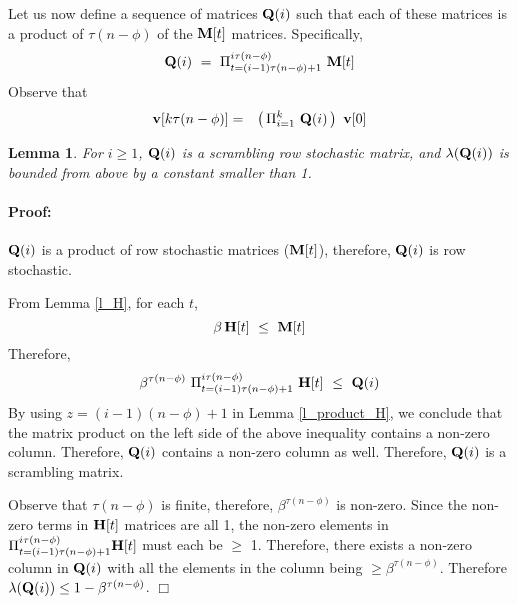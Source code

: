 \documentclass[letterpaper, 12pt]{article}
\newenvironment{proof}{\paragraph{\bf Proof:}}{\hspace*{\fill}\(\Box\)}
\newtheorem{lemma}{Lemma}
\begin{document}
Let us now define a sequence of matrices ${\bf Q}(i)$ such that
each of these matrices is a product of $\tau(n-\phi)$ of the
${\bf M}[t]$ matrices. Specifically,
\[
{\bf Q}(i) ~=~ \Pi_{t=(i-1)\tau(n-\phi)+1}^{i\tau(n-\phi)} ~ {\bf M}[t]
\]
Observe that
\begin{eqnarray}
{\bf v}[k\tau(n-\phi)] & = & \left(\, \Pi_{i=1}^k ~ {\bf Q}(i) \,\right)~{\bf v}[0]
\end{eqnarray}


\begin{lemma}
\label{l_Q}
For $i\geq 1$, ${\bf Q}(i)$ is a scrambling row stochastic matrix,
and $\lambda({\bf Q}(i))$ is bounded from above by a constant
smaller than 1.
\end{lemma}
\begin{proof}


${\bf Q}(i)$ is a product of row stochastic matrices (${\bf M}[t]$), therefore,
${\bf Q}(i)$ is row stochastic.

From Lemma \ref{l_H}, for each $t$,
\[
\beta \, {\bf H}[t] ~ \leq ~ {\bf M}[t]
\]
Therefore, 
\[
\beta^{\tau(n-\phi)} ~ \Pi_{t=(i-1)\tau(n-\phi)+1}^{i\tau(n-\phi)} ~ {\bf H}[t] ~ \leq 
~ {\bf Q}(i)
\]
By using $z=(i-1)(n-\phi)+1$ in Lemma \ref{l_product_H},
we conclude that the matrix product on the left side
of the above inequality contains a non-zero column. Therefore, ${\bf Q}(i)$ contains
a non-zero column as well. Therefore, ${\bf Q}(i)$ is a scrambling matrix.

Observe that $\tau(n-\phi)$ is finite, therefore, $\beta^{\tau(n-\phi)}$
is non-zero. Since the non-zero terms in ${\bf H}[t]$ matrices are all 1,
the non-zero elements in $\Pi_{t=(i-1)\tau(n-\phi)+1}^{i\tau(n-\phi)} {\bf H}[t]$
must each be $\geq$ 1. Therefore, there exists a non-zero column in ${\bf Q}(i)$
with all the elements in the column being $\geq \beta^{\tau(n-\phi)}$.
Therefore $\lambda({\bf Q}(i))\leq 1-\beta^{\tau(n-\phi)}$.
\end{proof}
\end{document}
